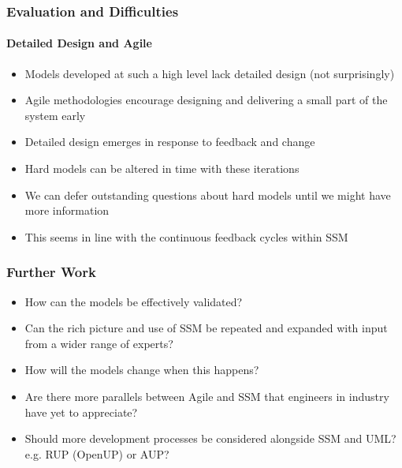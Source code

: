 \documentclass{beamer}
\begin{document}
\begin{frame}
  \frametitle{Evaluation and Difficulties}
  \framesubtitle{Detailed Design and Agile}
  \begin{itemize}
    \pause \item Models developed at such a high level lack detailed design (not surprisingly)
    \pause \item Agile methodologies encourage designing and delivering a small part of the system early
    \pause \item Detailed design emerges in response to feedback and change
    \pause \item Hard models can be altered in time with these iterations
    \pause \item We can defer outstanding questions about hard models until we might have more information
    \pause \item This seems in line with the continuous feedback cycles within SSM
  \end{itemize}
\end{frame}


\begin{frame}
  \frametitle{Further Work}
  \begin{itemize}
    \pause \item How can the models be effectively validated?
    \pause \item Can the rich picture and use of SSM be repeated and expanded with input from a wider range of experts?
    \pause \item How will the models change when this happens?
    \pause \item Are there more parallels between Agile and SSM that engineers in industry have yet to appreciate?
    \pause \item Should more development processes be considered alongside SSM and UML? e.g. RUP (OpenUP) or AUP?
  \end{itemize}
\end{frame}
\end{document}

